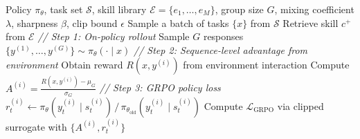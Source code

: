 \documentclass{llmxive}
\providecommand{\methodname}{\textsc{SDAR}\xspace}
\providecommand{\mycomment}[1]{\textit{// #1}}
\begin{document}
\begin{algorithm}[h]
  \caption{\methodname}
  \label{alg:cgtd}                     
  \begin{algorithmic}[1]                                                                        
  \Require Policy $\pi_{\theta}$, task set $\mathcal{S}$, skill library $\mathcal{E} =          
  \{e_1,\dots,e_M\}$, group size $G$, mixing coefficient $\lambda$, sharpness $\beta$, clip     
  bound $\epsilon$                                                                              
      \State Sample a batch of tasks $\{x\}$ from $\mathcal{S}$                                 
          \State Retrieve skill $c^{+}$ from $\mathcal{E}$    
          \State \mycomment{Step 1: On-policy rollout}                                          
          \State Sample $G$ responses $\{y^{(1)},\dots,y^{(G)}\} \sim \pi_{\theta}(\cdot \mid   
  x)$                                                                                           
          \State \mycomment{Step 2: Sequence-level advantage from environment}                  
              \State Obtain reward $R(x, y^{(i)})$ from environment interaction                 
          \EndFor                                                                               
          \State Compute $A^{(i)} = \frac{R(x,y^{(i)}) - \mu_G}{\sigma_G}$                      
          \State \mycomment{Step 3: GRPO policy loss}                                           
                  \State $r_t^{(i)} \gets \pi_{\theta}(y_t^{(i)} \mid s_t^{(i)}) \,/\,          
  \pi_{\theta_{\mathrm{old}}}(y_t^{(i)} \mid s_t^{(i)})$                                        
              \EndFor                                                                           
          \EndFor                                                                               
          \State Compute $\mathcal{L}_{\mathrm{GRPO}}$ via clipped surrogate with $\{A^{(i)},   
  r_t^{(i)}\}$                                                                                  

\end{algorithmic}
\end{algorithm}
\end{document}
